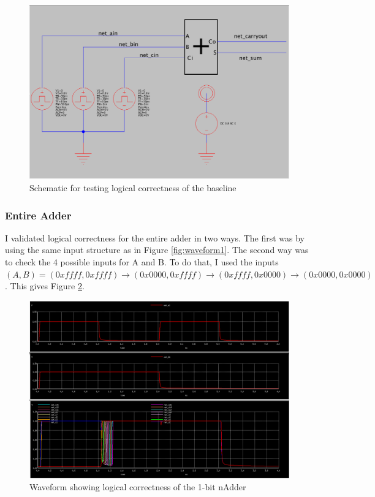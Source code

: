 \documentclass{article}
\begin{document}
\begin{figure}[H]
  \includegraphics[width=\linewidth]{baseline_screenshots/baseline_test_logic_sch.png}
  \caption{Schematic for testing logical correctness of the baseline}
  \label{fig:baseline_test_logic}
\end{figure}

\subsubsection{Entire Adder}
I validated logical correctness for the entire adder in two ways. The first was by using the same input structure as in Figure \ref{fig:waveform1}. The second way was to check the 4 possible inputs for A and B. To do that, I used the inputs $(A, B) = (0xffff, 0xffff) \rightarrow (0x0000, 0xffff) \rightarrow (0xffff, 0x0000) \rightarrow (0x0000, 0x0000)$. This gives Figure \ref{fig:test_logic_16b_adder2}.

\begin{figure}[H]
  \includegraphics[width=\linewidth]{opt_screenshots/test_logic_16b_adder.png}
  \caption{Waveform showing logical correctness of the 1-bit nAdder}
  \label{fig:test_logic_16b_adder2}
\end{figure}
\end{document}
